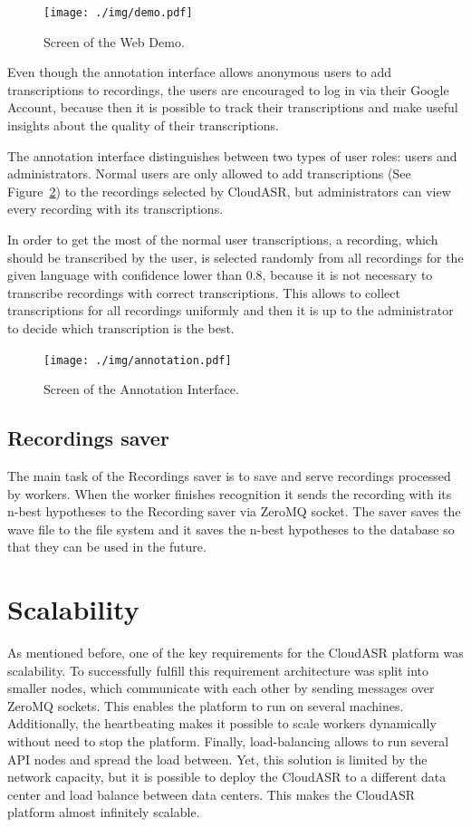 \begin{figure}[h]
  \centering
  \texttt{[image: ./img/demo.pdf]}

  \caption{Screen of the Web Demo.}
  \label{fig:webdemo}
\end{figure}

Even though the annotation interface allows anonymous users to add transcriptions to recordings,
  the users are encouraged to log in via their Google Account,
  because then it is possible to track their transcriptions
    and make useful insights about the quality of their transcriptions.

The annotation interface distinguishes between two types of user roles: users and administrators.
Normal users are only allowed to add transcriptions (See Figure~\ref{fig:annotation-interface}) to the recordings selected by CloudASR,
  but administrators can view every recording with its transcriptions.

In order to get the most of the normal user transcriptions,
  a recording, which should be transcribed by the user,
  is selected randomly from all recordings for the given language with confidence lower than 0.8,
    because it is not necessary to transcribe recordings with correct transcriptions.
This allows to collect transcriptions for all recordings uniformly
  and then it is up to the administrator to decide which transcription is the best.

\begin{figure}[h]
  \centering
  \texttt{[image: ./img/annotation.pdf]}

  \caption{Screen of the Annotation Interface.}
  \label{fig:annotation-interface}
\end{figure}



\subsection{Recordings saver}
The main task of the Recordings saver is to save and serve recordings processed by workers.
When the worker finishes recognition
  it sends the recording with its n-best hypotheses to the Recording saver via ZeroMQ socket.
The saver saves the wave file to the file system
  and it saves the n-best hypotheses to the database so that they can be used in the future.


\section{Scalability}
As mentioned before, one of the key requirements for the CloudASR platform was scalability.
To successfully fulfill this requirement architecture was split into smaller nodes,
  which communicate with each other by sending messages over ZeroMQ sockets.
This enables the platform to run on several machines.
Additionally, the heartbeating makes it possible to scale workers dynamically without need to stop the platform.
Finally, load-balancing allows to run several API nodes and spread the load between.
Yet, this solution is limited by the network capacity,
  but it is possible to deploy the CloudASR to a different data center
  and load balance between data centers.
This makes the CloudASR platform almost infinitely scalable.


